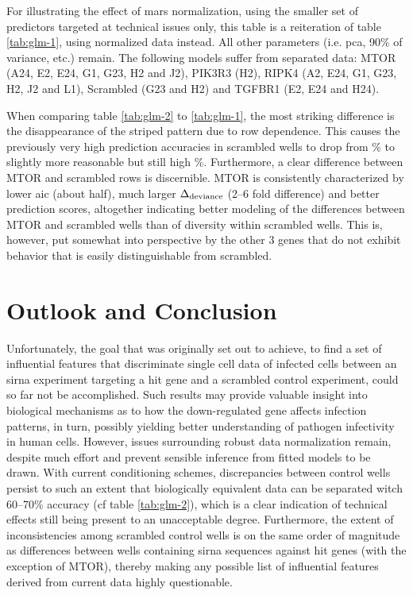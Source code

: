 \renewcommand{\arraystretch}{1.5}
\setlength{\tabcolsep}{0.25em}
\begin{table}
  \centering
  \caption[Reiteration of table \ref{tab:glm-1}, using normalized features for \gls{glm} fitting.]{For illustrating the effect of \gls{mars} normalization, using the smaller set of predictors targeted at technical issues only, this table is a reiteration of table \ref{tab:glm-1}, using normalized data instead. All other parameters (i.e. \gls{pca}, 90\% of variance, etc.) remain. The following models suffer from separated data: MTOR (A24, E2, E24, G1, G23, H2 and J2), PIK3R3 (H2), RIPK4 (A2, E24, G1, G23, H2, J2 and L1), Scrambled (G23 and H2) and TGFBR1 (E2, E24 and H24).}
  \label{tab:glm-2}
  \footnotesize
  \vspace{5px}
  
\end{table}

When comparing table \ref{tab:glm-2} to  \ref{tab:glm-1}, the most striking difference is the disappearance of the striped pattern due to row dependence. This causes the previously very high prediction accuracies in scrambled wells to drop from \% to slightly more reasonable but still high \%. Furthermore, a clear difference between MTOR and scrambled rows is discernible. MTOR is consistently characterized by lower \gls{aic} (about half), much larger $\Delta\textsubscript{deviance}$ (2--6 fold difference) and better prediction scores, altogether indicating better modeling of the differences between MTOR and scrambled wells than of diversity within scrambled wells. This is, however, put somewhat into perspective by the other 3 genes that do not exhibit behavior that is easily distinguishable from scrambled.

\section{Outlook and Conclusion}
Unfortunately, the goal that was originally set out to achieve, to find a set of influential features that discriminate single cell data of infected cells between an \gls{sirna} experiment targeting a hit gene and a scrambled control experiment, could so far not be accomplished. Such results may provide valuable insight into biological mechanisms as to how the down-regulated gene affects infection patterns, in turn, possibly yielding better understanding of pathogen infectivity in human cells. However, issues surrounding robust data normalization remain, despite much effort and prevent sensible inference from fitted models to be drawn. With current conditioning schemes, discrepancies between control wells persist to such an extent that biologically equivalent data can be separated witch 60--70\% accuracy (cf table \ref{tab:glm-2}), which is a clear indication of technical effects still being present to an unacceptable degree. Furthermore, the extent of inconsistencies among scrambled control wells is on the same order of magnitude as differences between wells containing \gls{sirna} sequences against hit genes (with the exception of MTOR), thereby making any possible list of influential features derived from current data highly questionable.

